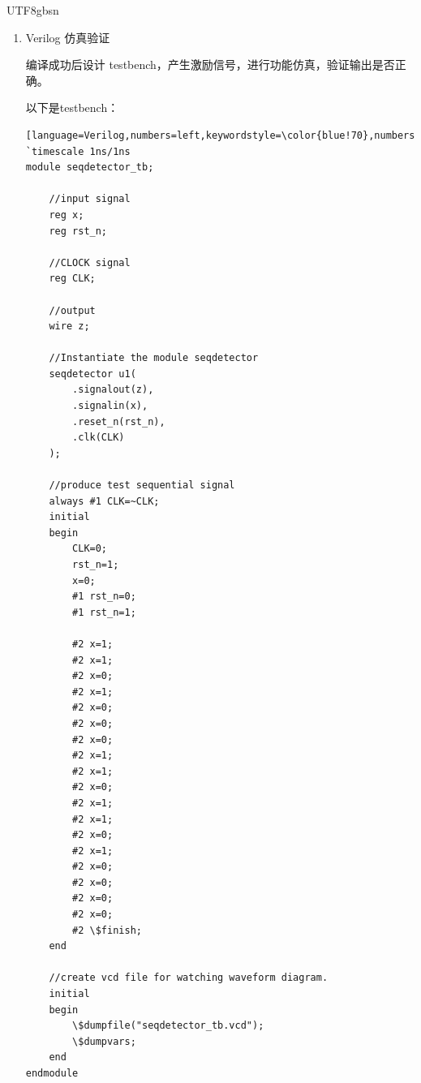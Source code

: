 \documentclass[titlepage,11pt,a4paper]{article}
\begin{document}
\begin{CJK}{UTF8}{gbsn}
\begin{enumerate}
{{\begin{lstlisting}[language=Verilog,numbers=left,keywordstyle=\color{blue!70},numberstyle=\tiny,escapechar=`,commentstyle=\color{red!50!green!50!blue!50},frame=shadowbox,rulesepcolor=\color{red!20!green!20!blue!20}]
//detect sequence 110100
always @ *
begin
	case (current_state)
		S1:begin
			if(signalin) next_state=S2;
			else next_state=S1;
		end
		S2:begin
			if(signalin) next_state=S3;
			else next_state=S1;
		end
		S3:begin
			if(~signalin) next_state=S4;
			else next_state=S3;
		end
		S4:begin
			if(signalin) next_state=S5;
			else next_state=S1;
		end
		S5:begin
			if(~signalin) next_state=S6;
			else next_state=S3;
		end
		S6:begin
			if(~signalin) next_state=S7;
			else next_state=S2;
		end
		S7:begin
			if(signalin) next_state=S2;
			else next_state=S1;
		end
	endcase
end

//define output of each states
always @(posedge clk,negedge reset_n)
begin
	if(!reset_n)
		signalout<=0;
	else
		case(current_state)
			S1:signalout<=0;
			S2:signalout<=0;
			S3:signalout<=0;
			S4:signalout<=0;
			S5:signalout<=0;
			S6:signalout<=0;
			S7:signalout<=1;
		endcase
end

endmodule

\end{lstlisting}
}}
	\item Verilog 仿真验证

		编译成功后设计 testbench，产生激励信号，进行功能仿真，验证输出是否正确。
		
		以下是testbench：
{\tiny
{\mono
	\begin{lstlisting}[language=Verilog,numbers=left,keywordstyle=\color{blue!70},numberstyle=\tiny,,commentstyle=\color{red!50!green!50!blue!50},frame=shadowbox,rulesepcolor=\color{red!20!green!20!blue!20}]
`timescale 1ns/1ns
module seqdetector_tb;

	//input signal
	reg x;
	reg rst_n;

	//CLOCK signal
	reg CLK;

	//output
	wire z;

	//Instantiate the module seqdetector
	seqdetector u1(
		.signalout(z),
		.signalin(x),
		.reset_n(rst_n),
		.clk(CLK)
	);
	
	//produce test sequential signal
	always #1 CLK=~CLK;
	initial 
	begin
		CLK=0;
		rst_n=1;
		x=0;
		#1 rst_n=0;
		#1 rst_n=1;

		#2 x=1;
		#2 x=1;
		#2 x=0;
		#2 x=1;
		#2 x=0;
		#2 x=0;
		#2 x=0;
		#2 x=1;
		#2 x=1;
		#2 x=0;
		#2 x=1;
		#2 x=1;
		#2 x=0;
		#2 x=1;
		#2 x=0;
		#2 x=0;
		#2 x=0;
		#2 x=0;
		#2 \$finish;
	end

	//create vcd file for watching waveform diagram.
	initial
	begin
		\$dumpfile("seqdetector_tb.vcd");
		\$dumpvars;
	end
endmodule
\end{lstlisting}
}}


\end{enumerate}
\end{CJK}
\end{document}

